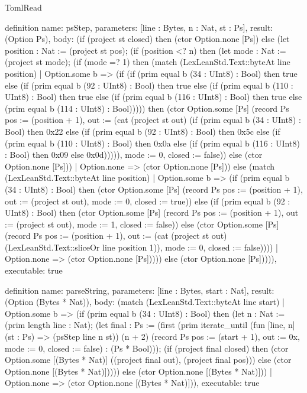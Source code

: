 \begin{lexlean}{TomlRead}
\begin{semanticmodule}
definition{
  name: psStep,
  parameters: [line : Bytes, n : Nat, st : Ps],
  result: (Option Ps),
  body: (if (project st closed) then (ctor Option.none [Ps]) else (let position : Nat := (project st pos); (if (position <? n) then (let mode : Nat := (project st mode); (if (mode =? 1) then (match (LexLeanStd.Text::byteAt line position)
    | Option.some b => (if (if (prim equal b (34 : UInt8) : Bool) then true else (if (prim equal b (92 : UInt8) : Bool) then true else (if (prim equal b (110 : UInt8) : Bool) then true else (if (prim equal b (116 : UInt8) : Bool) then true else (prim equal b (114 : UInt8) : Bool))))) then (ctor Option.some [Ps] (record Ps {pos := (position + 1), out := (cat (project st out) (if (prim equal b (34 : UInt8) : Bool) then 0x22 else (if (prim equal b (92 : UInt8) : Bool) then 0x5c else (if (prim equal b (110 : UInt8) : Bool) then 0x0a else (if (prim equal b (116 : UInt8) : Bool) then 0x09 else 0x0d))))), mode := 0, closed := false})) else (ctor Option.none [Ps]))
    | Option.none => (ctor Option.none [Ps])) else (match (LexLeanStd.Text::byteAt line position)
    | Option.some b => (if (prim equal b (34 : UInt8) : Bool) then (ctor Option.some [Ps] (record Ps {pos := (position + 1), out := (project st out), mode := 0, closed := true})) else (if (prim equal b (92 : UInt8) : Bool) then (ctor Option.some [Ps] (record Ps {pos := (position + 1), out := (project st out), mode := 1, closed := false})) else (ctor Option.some [Ps] (record Ps {pos := (position + 1), out := (cat (project st out) (LexLeanStd.Text::sliceOr line position 1)), mode := 0, closed := false}))))
    | Option.none => (ctor Option.none [Ps])))) else (ctor Option.none [Ps])))),
  executable: true
}

definition{
  name: parseString,
  parameters: [line : Bytes, start : Nat],
  result: (Option (Bytes * Nat)),
  body: (match (LexLeanStd.Text::byteAt line start)
    | Option.some b => (if (prim equal b (34 : UInt8) : Bool) then (let n : Nat := (prim length line : Nat); (let final : Ps := (first (prim iterate_until (fun [line, n] (st : Ps) => (psStep line n st)) (n + 2) (record Ps {pos := (start + 1), out := 0x, mode := 0, closed := false}) : (Ps * Bool))); (if (project final closed) then (ctor Option.some [(Bytes * Nat)] ((project final out), (project final pos))) else (ctor Option.none [(Bytes * Nat)])))) else (ctor Option.none [(Bytes * Nat)]))
    | Option.none => (ctor Option.none [(Bytes * Nat)])),
  executable: true
}


\end{semanticmodule}
\end{lexlean}
